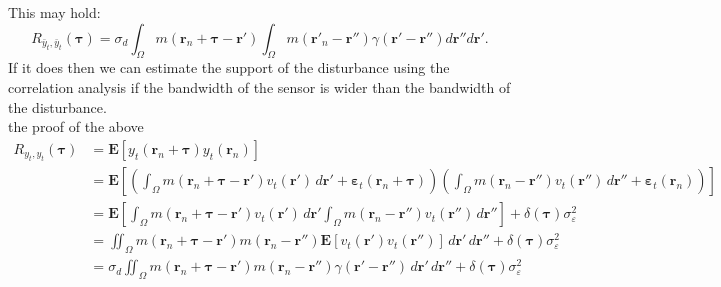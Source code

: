 \documentclass[review,authoryear,3p]{elsarticle}
\begin{document}
This may hold:
\begin{equation}
	R_{\bar{y}_{t},\bar{y}_{t} } (\boldsymbol{\tau}) = \sigma_d \int_{\Omega}{ m(\mathbf{r}_n+\boldsymbol{\tau}-\mathbf{r}')\int_{\Omega}{ m(\mathbf{r}'_n-\mathbf{r}'') \gamma(\mathbf{r}'-\mathbf{r}'') d\mathbf{r}''} d\mathbf{r}'}.
\end{equation}
If it does then we can estimate the support of the disturbance using the correlation analysis if the bandwidth of the sensor is wider than the bandwidth of the disturbance.\\
the proof of the above\\
\begin{align}
	R_{y_{t},y_{t}}(\boldsymbol{\tau}) &= \mathbf{E}\left[y_{t}\left(\mathbf{r}_n+\boldsymbol{\tau}\right)y_{t}\left(\mathbf{r}_n\right)\right] \\
	&= \mathbf{E}\left[\left(\int_{\Omega}{ m\left(\mathbf{r}_n + \boldsymbol{\tau} - \mathbf{r}'\right) v_t\left(\mathbf{r}'\right)\, d\mathbf{r}'} + \boldsymbol{\varepsilon}_t\left(\mathbf{r}_n+\boldsymbol{\tau}\right)\right) \left(\int_{\Omega}{ m\left(\mathbf{r}_n - \mathbf{r}''\right) v_{t}\left(\mathbf{r}''\right) \, d\mathbf{r}''} + \boldsymbol{\varepsilon}_{t}\left(\mathbf{r}_n\right)\right) \right]\\
	&=\mathbf{E}\left[\int_{\Omega}{ m\left(\mathbf{r}_n + \boldsymbol{\tau} - \mathbf{r}'\right) v_t\left(\mathbf{r}'\right)\, d\mathbf{r}'} \int_{\Omega}{ m\left(\mathbf{r}_n - \mathbf{r}''\right) v_{t}\left(\mathbf{r}''\right) \, d\mathbf{r}''}\right] + \delta(\boldsymbol{\tau})\sigma_{\varepsilon}^2 \\
	&=\iint_{\Omega}{ m\left(\mathbf{r}_n + \boldsymbol{\tau} - \mathbf{r}'\right) m\left(\mathbf{r}_n - \mathbf{r}''\right) \mathbf{E}\left[v_t\left(\mathbf{r}'\right) v_{t}\left(\mathbf{r}''\right)\right]\, d\mathbf{r}'}{ \, d\mathbf{r}''} + \delta(\boldsymbol{\tau})\sigma_{\varepsilon}^2\\
	&=\sigma_d\iint_{\Omega}{ m\left(\mathbf{r}_n + \boldsymbol{\tau} - \mathbf{r}'\right) m\left(\mathbf{r}_n - \mathbf{r}''\right)\gamma(\mathbf{r}'-\mathbf{r}'') \, d\mathbf{r}'}{ \, d\mathbf{r}''} + \delta(\boldsymbol{\tau})\sigma_{\varepsilon}^2\label{eq:ObsCorr}
\end{align}
\end{document}
